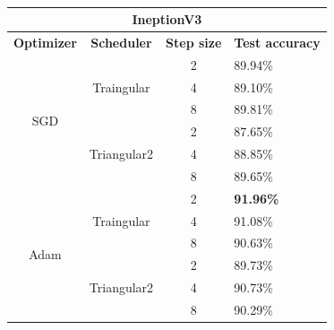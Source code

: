 \begin{table}[ht!]
\centering
\caption{}
\label{tab:inception}
\begin{tabular}{|ccll|}
\hline
\multicolumn{4}{|c|}{\textbf{IneptionV3}}                                          \\ \hline
\multicolumn{1}{|c|}{\textbf{Optimizer}}    & \multicolumn{1}{c|}{\textbf{Scheduler}}           & \multicolumn{1}{c|}{\textbf{Step size}} & \textbf{Test accuracy} \\ \hline
\multicolumn{1}{|c|}{\multirow{6}{*}{SGD}}  & \multicolumn{1}{c|}{\multirow{3}{*}{Traingular}}  & \multicolumn{1}{c|}{2}                  &  89.94\%                \\ \cline{3-4} 
\multicolumn{1}{|c|}{} & \multicolumn{1}{c|}{} & \multicolumn{1}{c|}{4} & 89.10\% \\ \cline{3-4} 
\multicolumn{1}{|c|}{} & \multicolumn{1}{c|}{} & \multicolumn{1}{c|}{8} & 89.81\% \\ \cline{2-4} 
\multicolumn{1}{|c|}{}                      & \multicolumn{1}{c|}{\multirow{3}{*}{Triangular2}} & \multicolumn{1}{c|}{2}                  &  87.65\%               \\ \cline{3-4} 
\multicolumn{1}{|c|}{} & \multicolumn{1}{c|}{} & \multicolumn{1}{c|}{4} & 88.85\% \\ \cline{3-4} 
\multicolumn{1}{|c|}{} & \multicolumn{1}{c|}{} & \multicolumn{1}{c|}{8} & 89.65\% \\ \hline
\multicolumn{1}{|c|}{\multirow{6}{*}{Adam}} & \multicolumn{1}{c|}{\multirow{3}{*}{Traingular}}  & \multicolumn{1}{c|}{2}                  & \textbf{91.96\%}       \\ \cline{3-4} 
\multicolumn{1}{|c|}{} & \multicolumn{1}{c|}{} & \multicolumn{1}{c|}{4} & 91.08\% \\ \cline{3-4} 
\multicolumn{1}{|c|}{} & \multicolumn{1}{c|}{} & \multicolumn{1}{c|}{8} & 90.63\% \\ \cline{2-4} 
\multicolumn{1}{|c|}{}                      & \multicolumn{1}{c|}{\multirow{3}{*}{Triangular2}} & \multicolumn{1}{c|}{2}                  & 89.73\%                \\ \cline{3-4} 
\multicolumn{1}{|c|}{} & \multicolumn{1}{c|}{} & \multicolumn{1}{c|}{4} & 90.73\% \\ \cline{3-4} 
\multicolumn{1}{|c|}{} & \multicolumn{1}{c|}{} & \multicolumn{1}{c|}{8} & 90.29\% \\ \hline
\end{tabular}
\end{table}



